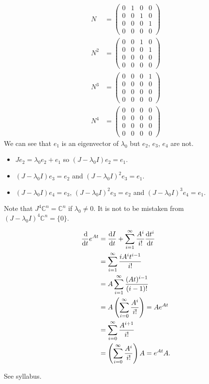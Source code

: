 \begin{solution}
  \begin{align*}
    N & =
    \begin{pmatrix}
      0 & 1 & 0 & 0\\
      0 & 0 & 1 & 0\\
      0 & 0 & 0 & 1\\
      0 & 0 & 0 & 0
    \end{pmatrix}\\
    N^2 & =
    \begin{pmatrix}
      0 & 0 & 1 & 0\\
      0 & 0 & 0 & 1\\
      0 & 0 & 0 & 0\\
      0 & 0 & 0 & 0
    \end{pmatrix}\\
    N^3 & =
    \begin{pmatrix}
      0 & 0 & 0 & 1\\
      0 & 0 & 0 & 0\\
      0 & 0 & 0 & 0\\
      0 & 0 & 0 & 0
    \end{pmatrix}\\
    N^4 & =
    \begin{pmatrix}
      0 & 0 & 0 & 0\\
      0 & 0 & 0 & 0\\
      0 & 0 & 0 & 0\\
      0 & 0 & 0 & 0
    \end{pmatrix}
  \end{align*}
  We can see that $e_1$ is an eigenvector of $\lambda_0$ but
  $e_2$, $e_3$, $e_4$ are not.
  \begin{itemize}
    \item $Je_2 = \lambda_0 e_2 + e_1$
      so $(J - \lambda_0 I)e_2 = e_1$.
    \item $(J - \lambda_0 I)e_3 = e_2$ and $(J - \lambda_0 I)^2e_3 = e_1$.
    \item $(J - \lambda_0 I)e_4 = e_3$, $(J - \lambda_0 I)^2e_3 = e_2$
      and $(J - \lambda_0 I)^3e_4 = e_1$.
  \end{itemize}

  Note that $J^4 \mathbb{C}^n = \mathbb{C}^n$ if $\lambda_0 \neq 0$.
  It is not to be mistaken from $(J - \lambda_0 I)^4 \mathbb{C}^n = \{0\}$.
\end{solution}

\begin{solution}
  \begin{align*}
    \frac{\operatorname{d}\! }{\operatorname{d}\! t}e^{At}
    & = \frac{\operatorname{d}\! I}{\operatorname{d}\! t} + \sum_{i=1}^\infty \frac{A^i}{i!} \frac{\operatorname{d}\! t^i}{\operatorname{d}\! t}\\
    & = \sum_{i=1}^\infty \frac{iA^it^{i-1}}{i!}\\
    & = A\sum_{i=1}^\infty \frac{(At)^{i-1}}{(i-1)!}\\
    & = A \left(\sum_{i=0}^\infty \frac{A^i}{i!}\right) = A e^{At}\\
    & = \sum_{i=0}^\infty \frac{A^{i+1}}{i!}\\
    & = \left(\sum_{i=0}^\infty \frac{A^i}{i!}\right)A = e^{At} A.
  \end{align*}
\end{solution}

\begin{solution}
  See syllabus.
\end{solution}

